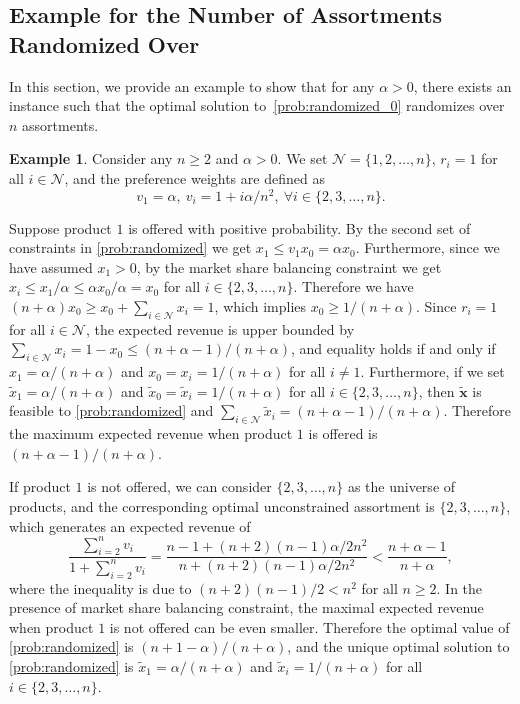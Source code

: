 \documentclass[mnsc,non-blindrev]{informs3}
\theoremstyle{definition}
\newtheorem{example}[theorem]{Example}
\begin{document}
\begin{appendices}{\Large{}}
\subsection{Example for the Number of Assortments Randomized Over}\label{sec:example:value_randomization}

In this section, we provide an example to show that for any $\alpha>0$, there exists an instance such that the optimal solution to~\ref{prob:randomized_0} randomizes over $n$ assortments.

\begin{example}\label{example:value_randomization}
Consider any $n\geq 2$ and $\alpha>0$. We set $\mathcal{N}=\{1,2,\dots,n\}$, $r_i=1$ for all $i\in\mathcal{N}$, and the preference weights are defined as
\begin{equation*}
v_1=\alpha,\ v_i=1+i\alpha/n^2,\ \forall i\in\{2,3,\dots,n\}.
\end{equation*}

Suppose product $1$ is offered with positive probability. By the second set of constraints in \ref{prob:randomized} we get $x_1\leq v_1x_0=\alpha x_0$. Furthermore, since we have assumed $x_1>0$, by the market share balancing constraint we get $x_i\leq x_1/\alpha\leq \alpha x_0/\alpha=x_0$ for all $i\in\{2,3,\dots,n\}$. Therefore we have \mbox{$(n+\alpha)x_0\geq x_0+\sum_{i\in\mathcal{N}}x_i=1$}, which implies $x_0\geq 1/(n+\alpha)$. Since $r_i=1$ for all $i\in\mathcal{N}$, the expected revenue is upper bounded by $\sum_{i\in\mathcal{N}}x_i=1-x_0\leq (n+\alpha-1)/(n+\alpha)$, and equality holds if and only if $x_1=\alpha/(n+\alpha)$ and $x_0=x_i=1/(n+\alpha)$ for all $i\neq 1$. Furthermore, if we set $\tilde{x}_1=\alpha/(n+\alpha)$ and $\tilde{x}_0=\tilde{x}_i=1/(n+\alpha)$ for all $i\in\{2,3,\dots,n\}$, then $\tilde{\bm{x}}$ is feasible to \ref{prob:randomized} and $\sum_{i\in\mathcal{N}}\tilde{x}_i=(n+\alpha-1)/(n+\alpha)$. Therefore the maximum expected revenue when product $1$ is offered is $(n+\alpha-1)/(n+\alpha)$.
 
If product $1$ is not offered, we can consider $\{2,3,\dots,n\}$ as the universe of products, and the corresponding optimal unconstrained assortment is $\{2,3,\dots,n\}$, which generates an expected revenue of
\begin{equation*}
\dfrac{\sum_{i=2}^n v_i}{1+\sum_{i=2}^n v_i}=\dfrac{n-1+(n+2)(n-1)\alpha/2n^2}{n+(n+2)(n-1)\alpha/2n^2}<\dfrac{n+\alpha-1}{n+\alpha},
\end{equation*}
where the inequality is due to $(n+2)(n-1)/2<n^2$ for all $n\geq 2$. In the presence of market share balancing constraint, the maximal expected revenue when product $1$ is not offered can be even smaller. Therefore the optimal value of \ref{prob:randomized} is $(n+1-\alpha)/(n+\alpha)$, and the unique optimal solution to \ref{prob:randomized} is $\tilde{x}_1=\alpha/(n+\alpha)$ and $\tilde{x}_i=1/(n+\alpha)$ for all $i\in\{2,3,\dots,n\}$. 


\end{example}
\end{appendices}
\end{document}
